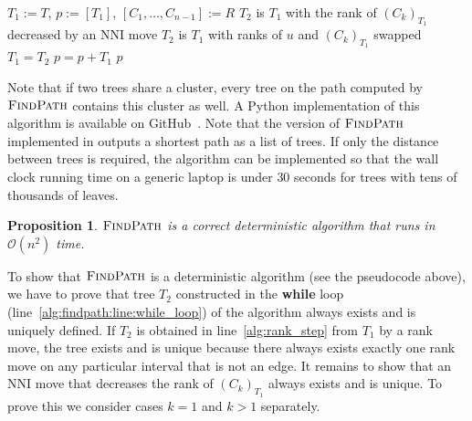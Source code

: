 \documentclass[11pt]{amsart}
\newtheorem{proposition}{Proposition}
\newcommand{\findpath}{\textsc{FindPath}}
\newcommand{\rank}{\mathrm{rank}}
\newcommand{\nni}{\mathrm{NNI}}
\renewcommand{\O}{\mathcal O}
\begin{document}
\begin{algorithm}[H]
\caption{$\findpath$($T,R$)}
\begin{algorithmic}[1]
\STATE $T_1 := T$, $p := [T_1]$, $[C_1, \ldots, C_{n-1}] := R$
\label{alg:findpath:line:for_loop}
	\WHILE {$\rank((C_k)_{T_1})>k$}
	\label{alg:findpath:line:while_loop}
			\STATE $T_2$ is $T_1$ with the rank of $(C_k)_{T_1}$ decreased by an $\nni$ move
			\label{alg:nni_step}
		\ELSE
			\STATE $T_2$ is $T_1$ with ranks of $u$ and $(C_k)_{T_1}$ swapped
			\label{alg:rank_step}
		\ENDIF
		\STATE $T_1 = T_2$
		\STATE $p = p+T_1$
	\ENDWHILE
\ENDFOR
\RETURN $p$
\end{algorithmic}
\end{algorithm}

Note that if two trees share a cluster, every tree on the path computed by $\findpath$ contains this cluster as well.
A Python implementation of this algorithm is available on GitHub~\autocite{Collienne2019}.
Note that the version of $\findpath$ implemented in \autocite{Collienne2019} outputs a shortest path as a list of trees.
If only the distance between trees is required, the algorithm can be implemented so that the wall clock running time on a generic laptop is under $30$ seconds for trees with tens of thousands of leaves.

\begin{proposition}
$\findpath$ is a correct deterministic algorithm that runs in $\O(n^2)$ time.
\label{prop:fp_correctness}
\end{proposition}

\proof
To show that $\findpath$ is a deterministic algorithm (see the pseudocode above), we have to prove that tree $T_2$ constructed in the \textbf{while} loop (line~\ref{alg:findpath:line:while_loop}) of the algorithm always exists and is uniquely defined.
If $T_2$ is obtained in line~\ref{alg:rank_step} from $T_1$ by a rank move, the tree exists and is unique because there always exists exactly one rank move on any particular interval that is not an edge.
It remains to show that an $\nni$ move that decreases the rank of $(C_k)_{T_1}$ always exists and is unique.
To prove this we consider cases $k = 1$ and $k > 1$ separately.
\end{document}
